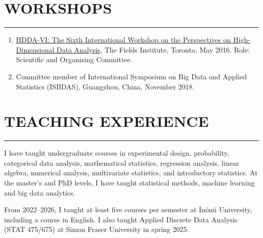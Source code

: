 \documentclass[10pt,letterpaper]{article}
\newcommand{\NewPart}[2]{%
	\Needspace{7\baselineskip}%
	\vspace{0.45em}%
	\section*{\sffamily\large\bfseries\color{MidnightBlue}\uppercase{#1} #2}%
	\vspace{-0.7em}\noindent\color{MidnightBlue}\rule{\textwidth}{0.55pt}\color{Black}\vspace{0.25em}}
\newcommand{\ThesisEntry}[5]{
		\noindent #1 -- #2 #3 ``#4'' \textit{#5}}
\begin{document}








\NewPart{Workshops}{}

\begin{enumerate}

\item \href{http://www.fields.utoronto.ca/activities/15-16/HDDA}{HDDA-VI: The Sixth International Workshop on the Perspectives on High-Dimensional Data Analysis}, The Fields Institute, Toronto, May 2016. Role: Scientific and Organizing Committee.

\item Committee member of International Symposium on Big Data and Applied Statistics (ISBDAS), Guangzhou, China, November 2018.

\end{enumerate}



\NewPart{Teaching Experience}{}

I have taught undergraduate courses in experimental design, probability, categorical data analysis, mathematical statistics, regression analysis, linear algebra, numerical analysis, multivariate statistics, and introductory statistics. At the master's and PhD levels, I have taught statistical methods, machine learning and big data analytics.

From 2022--2026, I taught at least five courses per semester at İnönü University, including a course in English. I also taught Applied Discrete Data Analysis (STAT 475/675) at Simon Fraser University in spring 2025.
\end{document}
